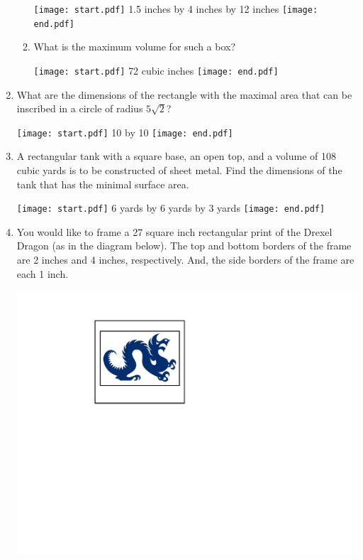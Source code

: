 \documentclass[12pt]{article}
\begin{document}
\begin{enumerate}
\begin{enumerate}
\texttt{[image: start.pdf]}
{{1.5 inches by 4 inches by 12 inches}}
\texttt{[image: end.pdf]}


\item What is the maximum volume for such a box?

\texttt{[image: start.pdf]}
{{72 cubic inches}}
\texttt{[image: end.pdf]}


\end{enumerate}

\item What are the dimensions of the rectangle with the maximal area that can be inscribed in a circle of radius $5\sqrt{2}$?

\texttt{[image: start.pdf]}
{{10 by 10}}
\texttt{[image: end.pdf]}


\item A rectangular tank with a square base, an open top, and a volume of 108 cubic yards is to be constructed of sheet metal.  Find the dimensions of the tank that has the minimal surface area.

\texttt{[image: start.pdf]}
{{6 yards by 6 yards by 3 yards}}
\texttt{[image: end.pdf]}


\item You would like to frame a 27 square inch rectangular print of the Drexel Dragon (as in the diagram below).  The top and bottom borders of the frame are 2 inches and 4 inches, respectively.  And, the side borders of the frame are each 1 inch.

\begin{center}
\includegraphics[scale=0.7]{mario.pdf}
\end{center}


\end{enumerate}
\end{document}
